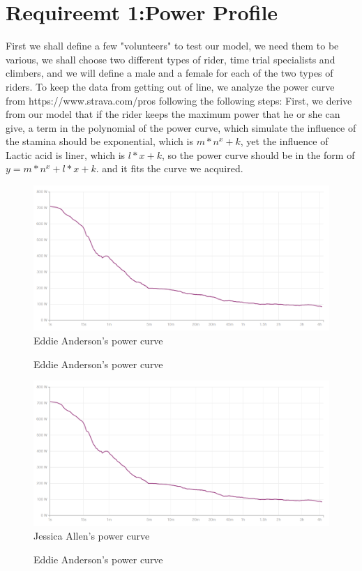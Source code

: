 \documentclass[12pt]{article}
\begin{document}
\section{Requireemt 1:Power Profile}
First we shall define a few "volunteers" to test our model, we need them to be various, we shall choose two different types of rider, time trial
specialists and climbers, and we will define a male and a female for each of the two types of riders. To keep the data from getting out of line, we analyze the power curve
from https://www.strava.com/pros following the following steps:
First, we derive from our model that if the rider keeps the maximum power that he or she can give, a term in the polynomial of the power curve,  which simulate the influence of the stamina should be exponential,
which is $m*n^x+k$, yet the influence of Lactic acid is liner, which is $l*x+k$, so the power curve should be in the form of $y=m*n^x+l*x+k$.
and it fits the curve we acquired.

\begin{figure}
    \centering
    \includegraphics[width=1\columnwidth]{Eddie Anderson}
    \caption{Eddie Anderson's power curve}
\end{figure}
\begin{figure}
    \centering
    
    \caption{Eddie Anderson's power curve}
\end{figure}

\begin{figure}
    \centering
    \includegraphics[width=1\columnwidth]{Jessica Allen}
    \caption{Jessica Allen's power curve}
\end{figure}
\begin{figure}
    \centering
    
    \caption{Eddie Anderson's power curve}
\end{figure}
\end{document}
